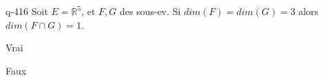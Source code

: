 \begin{truefalse}{q-416}
Soit $E=\mathbb R^5$, et $F,G$ des sous-ev. Si $dim(F)=dim(G)=3$ alors $dim(F \cap G)=1$.
\item Vrai
\item* Faux
\end{truefalse}

